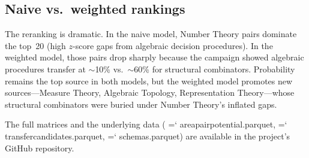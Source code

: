 \documentclass[11pt]{article}
\renewcommand{\texttt}[1]{%
  \begingroup\ttfamily\hyphenchar\font=`\-\relax
  \def\_{\textunderscore\discretionary{}{}{}}%
  #1\endgroup}
\theoremstyle{definition}
\theoremstyle{remark}
\begin{document}
\subsection{Naive vs.\ weighted rankings}

The reranking is dramatic.  In the naive model, Number Theory
pairs dominate the top~20 (high $z$-score gaps from algebraic
decision procedures).  In the weighted model, those pairs drop
sharply because the campaign showed algebraic procedures transfer
at ${\sim}$10\% vs.\ ${\sim}$60\% for structural combinators.
Probability remains the top source in both models, but the
weighted model promotes new sources---Measure Theory, Algebraic
Topology, Representation Theory---whose structural combinators
were buried under Number Theory's inflated gaps.

The full matrices and the underlying data
(\texttt{area\_pair\_potential.parquet},
\texttt{transfer\_candidates.parquet}, \texttt{schemas.parquet})
are available in the project's GitHub repository.
\end{document}
